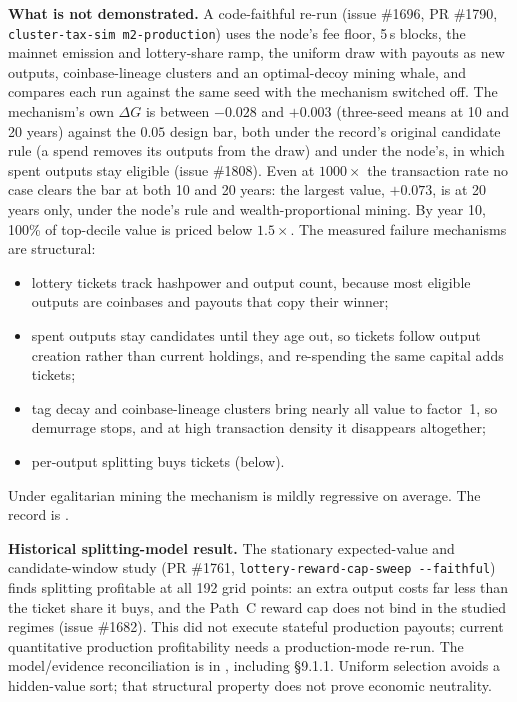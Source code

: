 \textbf{What is not demonstrated.} A code-faithful re-run (issue \#1696, PR
\#1790, \texttt{cluster-tax-sim m2-production}) uses the node's fee floor,
5\,s blocks, the mainnet emission and lottery-share ramp, the uniform draw
with payouts as new outputs, coinbase-lineage clusters and an optimal-decoy
mining whale, and compares each run against the same seed with the mechanism
switched off. The mechanism's own $\Delta G$ is between $-0.028$ and
$+0.003$ (three-seed means at 10 and 20 years) against the $0.05$ design
bar, both under the record's original candidate rule (a spend removes its
outputs from the draw) and under the node's, in which spent outputs stay
eligible (issue \#1808). Even at $1000\times$ the transaction rate no case
clears the bar at both 10 and 20 years: the largest value, $+0.073$, is at
20 years only, under the node's rule and wealth-proportional mining. By
year 10, 100\% of top-decile value is priced below $1.5\times$. The measured
failure mechanisms are structural:
\begin{itemize}
  \item lottery tickets track hashpower and output count, because most
    eligible outputs are coinbases and payouts that copy their winner;
  \item spent outputs stay candidates until they age out, so tickets
    follow output creation rather than current holdings, and re-spending
    the same capital adds tickets;
  \item tag decay and coinbase-lineage clusters bring nearly all value to
    factor~1, so demurrage stops, and at high transaction density it
    disappears altogether;
  \item per-output splitting buys tickets (below).
\end{itemize}
Under egalitarian mining the mechanism is mildly regressive on average. The
record is .

\textbf{Historical splitting-model result.} The stationary expected-value
and candidate-window study (PR \#1761, \texttt{lottery-reward-cap-sweep
-{}-faithful}) finds splitting profitable at all 192 grid points: an extra
output costs far less than the ticket share it buys, and the Path~C reward
cap does not bind in the studied regimes (issue \#1682). This did not execute
stateful production payouts; current quantitative production profitability
needs a production-mode re-run. The model/evidence reconciliation is in
, including \S9.1.1. Uniform
selection avoids a hidden-value sort; that structural property does not prove
economic neutrality.

